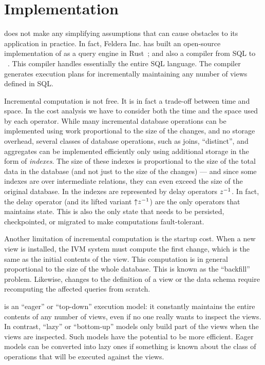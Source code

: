 \section{Implementation}\label{sec:implementation}


\dbsp does not make any simplifying assumptions that can cause
obstacles to its application in practice.  In fact, Feldera Inc. has
built an open-source implementation of \dbsp as a query engine in
Rust~\cite{dbsp-crate}; and also a compiler from SQL to
\dbsp~\cite{sql-to-dbsp-compiler}.  This compiler handles essentially
the entire SQL language.  The compiler generates execution plans for
incrementally maintaining any number of views defined in SQL.

Incremental computation is not free.  It is in fact a trade-off
between time and space.  In the cost analysis we have to consider both
the time and the space used by each operator.  While many incremental
database operations can be implemented using work proportional to the
size of the changes, and no storage overhead, several classes of
database operations, such as joins, ``distinct'', and aggregates can
be implemented efficiently only using additional storage in the form
of \emph{indexes}.  The size of these indexes is proportional to the
size of the total data in the database (and not just to the size of
the changes) --- and since some indexes are over intermediate
relations, they can even exceed the size of the original database.  In
\dbsp the indexes are represented by delay operators $z^{-1}$.  In fact,
the delay operator (and its lifted variant ${\uparrow}z^{-1}$) are the only
operators that maintains state.  This is also the only state that
needs to be persisted, checkpointed, or migrated to make \dbsp
computations fault-tolerant.

Another limitation of incremental computation is the startup cost.
When a new view is installed, the IVM system must compute the first
change, which is the same as the initial contents of the view.  This
computation is in general proportional to the size of the whole
database.  This is known as the ``backfill'' problem.  Likewise,
changes to the definition of a view or the data schema require
recomputing the affected queries from scratch.

\dbsp is an ``eager'' or ``top-down'' execution model: it constantly
maintains the entire contents of any number of views, even if no one
really wants to inspect the views.  In contrast, ``lazy'' or
``bottom-up'' models only build part of the views when the views are
inspected.  Such models have the potential to be more efficient.
Eager models can be converted into lazy ones if something is known
about the class of operations that will be executed against the views.

